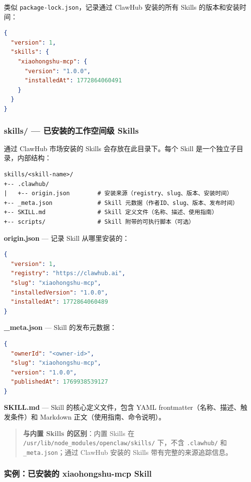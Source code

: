 类似 \texttt{package-lock.json}，记录通过 ClawHub 安装的所有 Skills 的版本和安装时间：

\begin{lstlisting}[language=json]
{
  "version": 1,
  "skills": {
    "xiaohongshu-mcp": {
      "version": "1.0.0",
      "installedAt": 1772864060491
    }
  }
}
\end{lstlisting}

\subsubsection{skills/ --- 已安装的工作空间级 Skills}


通过 ClawHub 市场安装的 Skills 会存放在此目录下。每个 Skill 是一个独立子目录，内部结构：

\begin{lstlisting}
skills/<skill-name>/
+-- .clawhub/
|   +-- origin.json        # 安装来源（registry、slug、版本、安装时间）
+-- _meta.json             # Skill 元数据（作者ID、slug、版本、发布时间）
+-- SKILL.md               # Skill 定义文件（名称、描述、使用指南）
+-- scripts/               # Skill 附带的可执行脚本（可选）
\end{lstlisting}

\textbf{origin.json} --- 记录 Skill 从哪里安装的：

\begin{lstlisting}[language=json]
{
  "version": 1,
  "registry": "https://clawhub.ai",
  "slug": "xiaohongshu-mcp",
  "installedVersion": "1.0.0",
  "installedAt": 1772864060489
}
\end{lstlisting}

\textbf{\_meta.json} --- Skill 的发布元数据：

\begin{lstlisting}[language=json]
{
  "ownerId": "<owner-id>",
  "slug": "xiaohongshu-mcp",
  "version": "1.0.0",
  "publishedAt": 1769938539127
}
\end{lstlisting}

\textbf{SKILL.md} --- Skill 的核心定义文件，包含 YAML frontmatter（名称、描述、触发条件）和 Markdown 正文（使用指南、命令说明）。

\begin{quote}
\textbf{与内置 Skills 的区别}：内置 Skills 在 \texttt{/usr/lib/node\_modules/openclaw/skills/} 下，不含 \texttt{.clawhub/} 和 \texttt{\_meta.json}；通过 ClawHub 安装的 Skills 带有完整的来源追踪信息。
\end{quote}

\subsubsection{实例：已安装的 xiaohongshu-mcp Skill}


